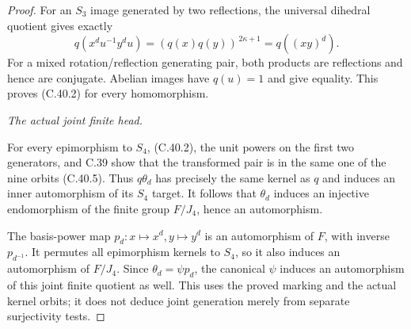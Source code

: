 \begin{proof}
For an \(S_3\) image generated by two reflections,
the universal dihedral quotient gives exactly
\[
          q(x^d u^{-1}y^d u)
              =(q(x)q(y))^{\,2\kappa+1}
              =q((xy)^d).
\]
For a mixed rotation/reflection generating pair, both
products are reflections and hence are conjugate.
Abelian images have \(q(u)=1\) and give equality.
This proves (C.40.2) for every homomorphism.

\emph{The actual joint finite head.}\par
For every epimorphism to \(S_4\), (C.40.2), the unit
powers on the first two generators, and C.39 show that
the transformed pair is in the same one of the nine
orbits (C.40.5). Thus \(q\theta_d\) has precisely the
same kernel as \(q\) and induces an inner automorphism
of its \(S_4\) target. It follows that \(\theta_d\)
induces an injective endomorphism of the finite group
\(F/J_4\), hence an automorphism.

The basis-power map \(p_d:x\mapsto x^d,y\mapsto y^d\)
is an automorphism of \(F\), with inverse \(p_{d^{-1}}\).
It permutes all epimorphism kernels to \(S_4\), so it
also induces an automorphism of \(F/J_4\).
Since \(\theta_d=\psi p_d\), the canonical \(\psi\)
induces an automorphism of this joint finite quotient
as well. This uses the proved marking and the actual
kernel orbits; it does not deduce joint generation
merely from separate surjectivity tests.
\end{proof}
